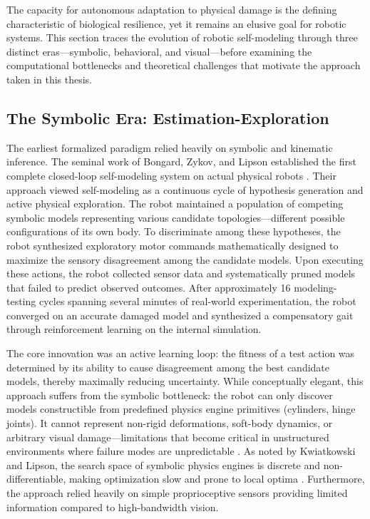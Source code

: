 ﻿\documentclass[12pt,a4paper,oneside]{report}
\begin{document}
The capacity for autonomous adaptation to physical damage is the defining characteristic of biological resilience, yet it remains an elusive goal for robotic systems. This section traces the evolution of robotic self-modeling through three distinct eras---symbolic, behavioral, and visual---before examining the computational bottlenecks and theoretical challenges that motivate the approach taken in this thesis.

\subsection{The Symbolic Era: Estimation-Exploration}

The earliest formalized paradigm relied heavily on symbolic and kinematic inference. The seminal work of Bongard, Zykov, and Lipson established the first complete closed-loop self-modeling system on actual physical robots \cite{bongard2006resilient}. Their approach viewed self-modeling as a continuous cycle of hypothesis generation and active physical exploration. The robot maintained a population of competing symbolic models representing various candidate topologies---different possible configurations of its own body. To discriminate among these hypotheses, the robot synthesized exploratory motor commands mathematically designed to maximize the sensory disagreement among the candidate models. Upon executing these actions, the robot collected sensor data and systematically pruned models that failed to predict observed outcomes. After approximately 16 modeling-testing cycles spanning several minutes of real-world experimentation, the robot converged on an accurate damaged model and synthesized a compensatory gait through reinforcement learning on the internal simulation.

The core innovation was an active learning loop: the fitness of a test action was determined by its ability to cause disagreement among the best candidate models, thereby maximally reducing uncertainty. While conceptually elegant, this approach suffers from the symbolic bottleneck: the robot can only discover models constructible from predefined physics engine primitives (cylinders, hinge joints). It cannot represent non-rigid deformations, soft-body dynamics, or arbitrary visual damage---limitations that become critical in unstructured environments where failure modes are unpredictable \cite{kwiatkowski2019task}. As noted by Kwiatkowski and Lipson, the search space of symbolic physics engines is discrete and non-differentiable, making optimization slow and prone to local optima \cite{kwiatkowski2019task}. Furthermore, the approach relied heavily on simple proprioceptive sensors providing limited information compared to high-bandwidth vision.
\end{document}
